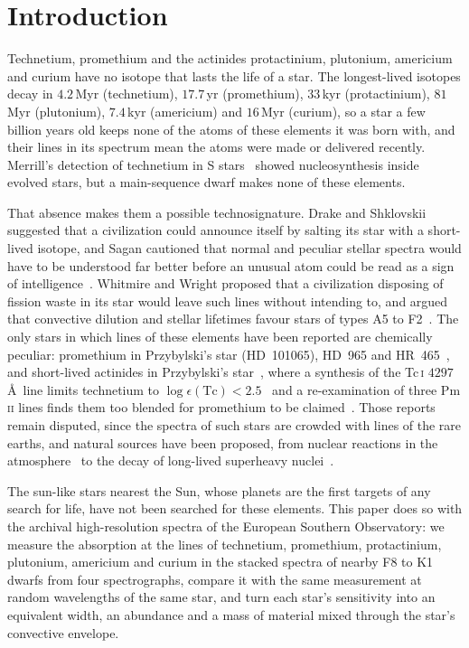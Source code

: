 \documentclass[3p,11pt]{elsarticle}
\newcommand{\ion}[2]{#1\,\textsc{#2}}
\begin{document}
\section{Introduction}\label{sec:intro}

Technetium, promethium and the actinides protactinium, plutonium, americium and curium
have no isotope that lasts the life of a star. The longest-lived isotopes decay in
$4.2$\,Myr (technetium), $17.7$\,yr (promethium), $33$\,kyr (protactinium), $81$\,Myr
(plutonium), $7.4$\,kyr (americium) and $16$\,Myr (curium), so a star a few billion
years old keeps none of the atoms of these elements it was born with, and their lines in
its spectrum mean the atoms were made or delivered recently. Merrill's detection of
technetium in S stars~\cite{Merrill1952} showed nucleosynthesis inside evolved stars,
but a main-sequence dwarf makes none of these elements.

That absence makes them a possible technosignature. Drake and Shklovskii suggested that
a civilization could announce itself by salting its star with a short-lived isotope, and
Sagan cautioned that normal and peculiar stellar spectra would have to be understood far
better before an unusual atom could be read as a sign of
intelligence~\cite{ShklovskiiSagan1966}. Whitmire and Wright proposed that a civilization
disposing of fission waste in its star would leave such lines without intending to, and
argued that convective dilution and stellar lifetimes favour stars of types A5 to
F2~\cite{WhitmireWright1980,Carrigan2010}. The only stars in which lines of these
elements have been reported are chemically peculiar: promethium in Przybylski's star
(HD~101065), HD~965 and HR~465~\cite{Cowley2004,Fivet2007}, and short-lived actinides
in Przybylski's star~\cite{Gopka2008}, where a synthesis of the \ion{Tc}{i}
$4297$\,\AA\ line limits technetium to $\log\epsilon(\mathrm{Tc})<2.5$~\cite{Andrievsky2023}
and a re-examination of three \ion{Pm}{ii} lines finds them too blended for
promethium to be claimed~\cite{Andrievsky2023b}.
Those reports remain disputed, since the spectra of such stars are crowded with lines of
the rare earths, and natural sources have been proposed, from nuclear reactions in the
atmosphere~\cite{Goriely2007} to the decay of long-lived superheavy
nuclei~\cite{Dzuba2017}.

The sun-like stars nearest the Sun, whose planets are the first targets of any search
for life, have not been searched for these elements. This paper does so with the
archival high-resolution spectra of the European Southern Observatory: we measure the
absorption at the lines of technetium, promethium, protactinium, plutonium, americium
and curium in the stacked spectra of nearby F8 to K1 dwarfs from four spectrographs,
compare it with the same measurement at random wavelengths of the same star, and turn
each star's sensitivity into an equivalent width, an abundance and a mass of material
mixed through the star's convective envelope.
\end{document}
